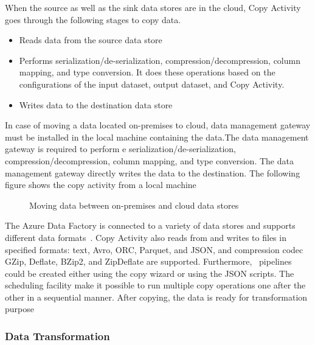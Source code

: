 \documentclass[9pt,twocolumn,twoside]{styles/osajnl}
\begin{document}
When the source as well as the sink data stores are in the cloud, Copy Activity goes through the following stages to copy data. 
\begin{itemize}
    \item Reads data from the source data store\item Performs serialization/de-serialization, compression/decompression, column mapping, and type conversion. It does these operations based on the configurations of the input dataset, output dataset, and Copy Activity.\item Writes data to the destination data store
\end{itemize}

In case of moving a data located on-premises to cloud, data management gateway must be installed in the local machine containing the data.The data management gateway is required to perform e serialization/de-serialization, compression/decompression, column mapping, and type conversion. The data management gateway directly writes the data to the destination. The following figure shows the copy activity from a local machine
\begin{figure}[htbp]
\centering
{}
\caption{Moving data between on-premises and cloud data stores~\cite{www-microsoft-azure-copy}}
\label{fig:copy-local}
\end{figure}

The Azure Data Factory is connected to a variety of data stores and supports different data formats~\cite{www-microsoft-azure-copy}. Copy Activity also reads from and writes to files in specified formats: text, Avro, ORC, Parquet, and JSON, and compression codec GZip, Deflate, BZip2, and ZipDeflate are supported. Furthermore,~\cite{www-microsoft-azure-copy} pipelines could be created either using the copy wizard or using the JSON scripts. The scheduling facility make it possible to run multiple copy operations one after the other in a sequential manner. After copying, the data is ready for transformation purpose

\subsubsection{Data Transformation}
\end{document}
